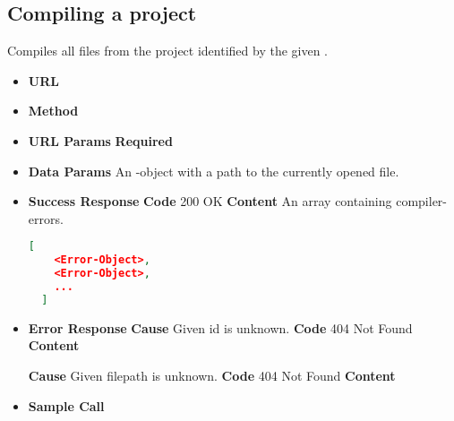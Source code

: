 \subsection{Compiling a project}
Compiles all files from the project identified by the given .

\begin{itemize}
\item \textbf{URL} 
\item \textbf{Method} 

\item \textbf{URL Params}
  \newline\textbf{Required} 

\item \textbf{Data Params} An -object with a path to the currently opened file.
  

\item \textbf{Success Response}
  \newline\textbf{Code} 200 OK
  \newline\textbf{Content} An array containing compiler-errors.
  \begin{lstlisting}[basicstyle=\small,language=json]
  [
    <Error-Object>,
    <Error-Object>,
    ...
  ]
  \end{lstlisting}
  
\item \textbf{Error Response}
  \newline\textbf{Cause} Given id is unknown.
  \newline\textbf{Code} 404 Not Found
  \newline\textbf{Content} 

  \fixedspace\textbf{Cause} Given filepath is unknown.
  \newline\textbf{Code} 404 Not Found
  \newline\textbf{Content} 

\item \textbf{Sample Call}
\end{itemize}
